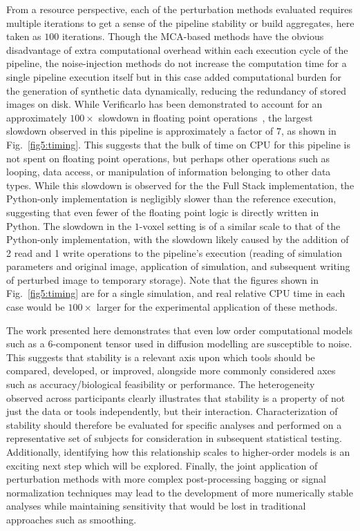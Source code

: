 \documentclass[fleqn,12pt]{SelfArx_ch} %
\begin{document}
From a resource perspective, each of the perturbation methods evaluated requires multiple iterations to get a sense of
the pipeline stability or build aggregates, here taken as $100$ iterations. Though the MCA-based methods have the
obvious disadvantage of extra computational overhead within each execution cycle of the pipeline, the noise-injection
methods do not increase the computation time for a single pipeline execution itself but in this case added
computational burden for the generation of synthetic data dynamically, reducing the redundancy of stored images on
disk. While Verificarlo has been demonstrated to account for an approximately $100 \times$ slowdown in floating
point operations~\cite{Denis2016-wo}, the largest slowdown observed in this pipeline is approximately a factor of $7$,
as shown in Fig.~\ref{fig5:timing}. This suggests that the bulk of time on CPU for this pipeline is not spent on
floating point operations, but perhaps other operations such as looping, data access, or manipulation of information
belonging to other data types. While this slowdown is observed for the the Full Stack implementation, the Python-only
implementation is negligibly slower than the reference execution, suggesting that even fewer of the floating point
logic is directly written in Python. The slowdown in the $1$-voxel setting is of a similar scale to that of the
Python-only implementation, with the slowdown likely caused by the addition of 2 read and 1 write operations to the
pipeline's execution (reading of simulation parameters and original image, application of simulation, and subsequent
writing of perturbed image to temporary storage). Note that the figures shown in Fig.~\ref{fig5:timing} are for a
single simulation, and real relative CPU time in each case would be $100 \times$ larger for the experimental
application of these methods.

The work presented here demonstrates that even low order computational models such as a 6-component tensor used in
diffusion modelling are susceptible to noise. This suggests that stability is a relevant axis upon which tools should
be compared, developed, or improved, alongside more commonly considered axes such as accuracy/biological feasibility or
performance. The heterogeneity observed across participants clearly illustrates that stability is a property of not
just the data or tools independently, but their interaction. Characterization of stability should therefore be
evaluated for specific analyses and performed on a representative set of subjects for consideration in subsequent
statistical testing. Additionally, identifying how this relationship scales to higher-order models is an exciting next
step which will be explored. Finally, the joint application of perturbation methods with more complex post-processing
bagging or signal normalization techniques may lead to the development of more numerically stable analyses while
maintaining sensitivity that would be lost in traditional approaches such as smoothing.
\end{document}
